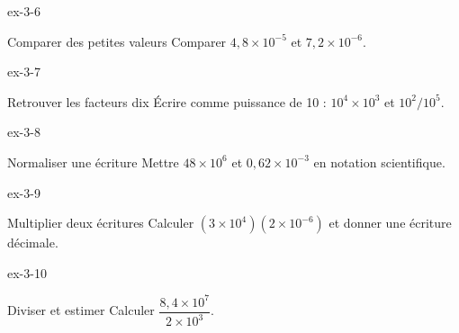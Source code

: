 \begin{blocLivre}{ex-3-6}\begin{exercice}[2]{Comparer des petites valeurs}
Comparer $4{,}8\times10^{-5}$ et $7{,}2\times10^{-6}$.
\end{exercice}\end{blocLivre}
\begin{blocLivre}{ex-3-7}\begin{exercice}[2]{Retrouver les facteurs dix}
Écrire comme puissance de 10 : $10^4\times10^3$ et $10^2/10^5$.
\end{exercice}\end{blocLivre}
\begin{blocLivre}{ex-3-8}\begin{exercice}[2]{Normaliser une écriture}
Mettre $48\times10^6$ et $0{,}62\times10^{-3}$ en notation scientifique.
\end{exercice}\end{blocLivre}
\begin{blocLivre}{ex-3-9}\begin{exercice}[2]{Multiplier deux écritures}
Calculer $(3\times10^4)(2\times10^{-6})$ et donner une écriture décimale.
\end{exercice}\end{blocLivre}
\begin{blocLivre}{ex-3-10}\begin{exercice}[2]{Diviser et estimer}
Calculer $\dfrac{8{,}4\times10^7}{2\times10^3}$.
\end{exercice}\end{blocLivre}

